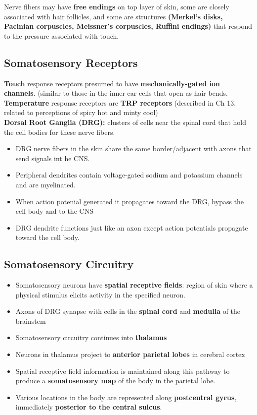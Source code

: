 \documentclass{article}
\begin{document}
\noindent Nerve fibers may have \textbf{free endings} on top layer of skin, some are closely associated with hair follicles, and some are structures \textbf{(Merkel's disks, Pacinian corpuscles, Meissner's corpuscles, Ruffini endings)} that respond to the pressure associated with touch. \\

\subsection{Somatosensory Receptors}
\textbf{Touch} response receptors presumed to have \textbf{mechanically-gated ion channels}. (similar to those in the inner ear cells that open as hair bends. \\

\noindent \textbf{Temperature} response receptors are \textbf{TRP receptors} (described in Ch 13, related to perceptions of spicy hot and minty cool) \\
 
\noindent \textbf{Dorsal Root Ganglia (DRG):} clusters of cells near the spinal cord that hold the cell bodies for these nerve fibers. 
\begin{itemize}
    \item DRG nerve fibers in the skin share the same border/adjacent with axons that send signals int he CNS. 
    \item Peripheral dendrites contain voltage-gated sodium and potassium channels and are myelinated. 
    \item When action potenial generated it propagates toward the DRG, bypass the cell body and to the CNS
    \item DRG dendrite functions just like an axon except action potentials propagate toward the cell body. 
\end{itemize}
    
\subsection{Somatosensory Circuitry}
\begin{itemize}
    \item Somatosensory neurons have \textbf{spatial receptive fields}: region of skin where a physical stimulus elicits activity in the specified neuron. 
    \item Axons of DRG synapse with cells in the \textbf{spinal cord} and \textbf{medulla} of the brainstem 
    \item Somatosensory circuitry continues into \textbf{thalamus}
    \item Neurons in thalamus project to \textbf{anterior parietal lobes} in cerebral cortex
    \item Spatial receptive field information is maintained along this pathway to produce a \textbf{somatosensory map} of the body in the parietal lobe. 
    \item Various locations in the body are represented along \textbf{postcentral gyrus}, immediately \textbf{posterior to the central sulcus}. 
\end{itemize}
\end{document}
